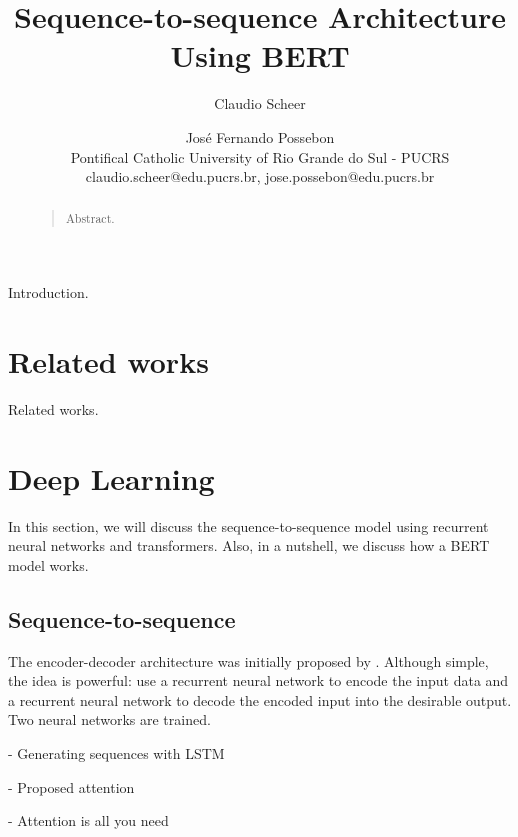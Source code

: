 \documentclass[letterpaper]{article}
\begin{document}
%
\title{Sequence-to-sequence Architecture\\Using BERT}
\author{Claudio Scheer \and José Fernando Possebon\\
    Pontifical Catholic University of Rio Grande do Sul - PUCRS\\
    claudio.scheer@edu.pucrs.br,
    jose.possebon@edu.pucrs.br
}

\maketitle

\begin{abstract}
\begin{quote}
Abstract.
\end{quote}
\end{abstract}

\noindent Introduction.


\section{Related works}
Related works.


\section{Deep Learning}

In this section, we will discuss the sequence-to-sequence model using recurrent neural networks and transformers. Also, in a nutshell, we discuss how a BERT model works.

\subsection{Sequence-to-sequence}

The encoder-decoder architecture was initially proposed by \cite{DBLP:journals/corr/ChoMGBSB14}. Although simple, the idea is powerful: use a recurrent neural network to encode the input data and a recurrent neural network to decode the encoded input into the desirable output. Two neural networks are trained.

\cite{DBLP:journals/corr/Graves13} - Generating sequences with LSTM

\cite{DBLP:journals/corr/BahdanauCB14} - Proposed attention

\cite{DBLP:journals/corr/VaswaniSPUJGKP17} - Attention is all you need
\end{document}
